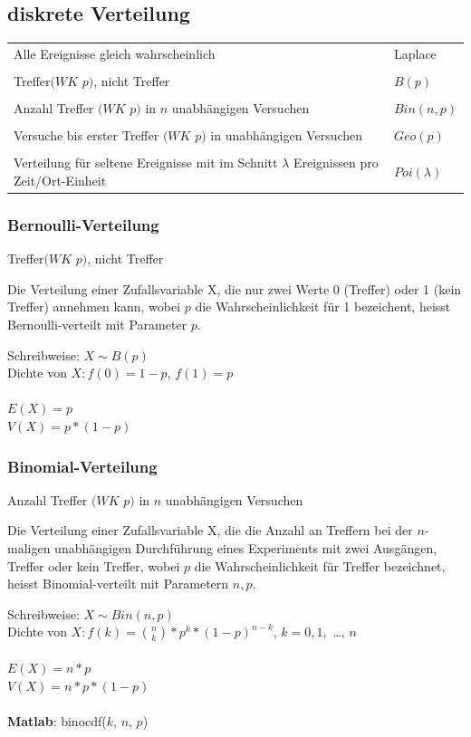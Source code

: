 \documentclass[10pt]{article}
\newtheorem[M]{definition}{Def.}
\newtheorem[M]{satz}{Satz}
\numberwithin{equation}{section}
\begin{document}
\subsection{diskrete Verteilung}
\begin{tabular}{l l}
	Alle Ereignisse gleich wahrscheinlich & Laplace \\
	\\
	Treffer$(WK$ $p)$, nicht Treffer & $B(p)$ \\
	\\
	Anzahl Treffer $(WK$ $p)$ in $n$ unabhängigen Versuchen & $Bin(n,p)$ \\
	\\
	Versuche bis erster Treffer $(WK$ $p)$ in unabhängigen Versuchen & $Geo(p)$ \\
	\\
	Verteilung für seltene Ereignisse mit im Schnitt $\lambda$ Ereignissen pro Zeit/Ort-Einheit & $Poi(\lambda)$ \\
\end{tabular}

\subsubsection{Bernoulli-Verteilung}
Treffer$(WK$ $p)$, nicht Treffer
\begin{definition}
Die Verteilung einer Zufallsvariable X, die nur zwei Werte 0 (Treffer) oder 1 (kein Treffer) annehmen kann, wobei $p$ die Wahrscheinlichkeit für 1 bezeichent, heisst Bernoulli-verteilt mit Parameter $p$. \\
\end{definition}
Schreibweise: $X \sim B(p)$ \\
Dichte von $X : f(0) = 1 - p$, $f(1) = p$ \\
\\
$E(X) = p$ \\
$V(X) = p*(1-p)$ \\

\subsubsection{Binomial-Verteilung}
Anzahl Treffer $(WK$ $p)$ in $n$ unabhängigen Versuchen
\begin{definition}
Die Verteilung einer Zufallsvariable X, die die Anzahl an Treffern bei der $n$-maligen unabhängigen Durchführung eines Experiments mit zwei Ausgängen, Treffer oder kein Treffer, wobei $p$ die Wahrscheinlichkeit für Treffer bezeichnet, heisst Binomial-verteilt mit Parametern $n,p$. \\
\end{definition}
Schreibweise: $X \sim Bin(n,p)$ \\
Dichte von $X : f(k) = \binom{n}{k} * p^k * (1-p)^{n-k}$, $k=0,1,$ \dots, $n$ \\
\\
$E(X) = n*p$ \\
$V(X) = n*p*(1-p)$ \\
\\
\textbf{Matlab}: binocdf($k$, $n$, $p$)
\end{document}
